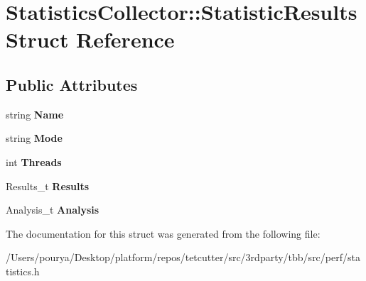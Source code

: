 \hypertarget{structStatisticsCollector_1_1StatisticResults}{}\section{Statistics\+Collector\+:\+:Statistic\+Results Struct Reference}
\label{structStatisticsCollector_1_1StatisticResults}
\subsection*{Public Attributes}
\begin{DoxyCompactItemize}
\item 
\hypertarget{structStatisticsCollector_1_1StatisticResults_a63c538874d95a6f6d91e16ead9a231b8}{}string {\bfseries Name}\label{structStatisticsCollector_1_1StatisticResults_a63c538874d95a6f6d91e16ead9a231b8}

\item 
\hypertarget{structStatisticsCollector_1_1StatisticResults_a173f4ae6f07474c25bef4e4b09756c7e}{}string {\bfseries Mode}\label{structStatisticsCollector_1_1StatisticResults_a173f4ae6f07474c25bef4e4b09756c7e}

\item 
\hypertarget{structStatisticsCollector_1_1StatisticResults_a7e977eed87cfb569f970bae50d7bf21d}{}int {\bfseries Threads}\label{structStatisticsCollector_1_1StatisticResults_a7e977eed87cfb569f970bae50d7bf21d}

\item 
\hypertarget{structStatisticsCollector_1_1StatisticResults_af7502552979e114f559d2c6da441f526}{}Results\+\_\+t {\bfseries Results}\label{structStatisticsCollector_1_1StatisticResults_af7502552979e114f559d2c6da441f526}

\item 
\hypertarget{structStatisticsCollector_1_1StatisticResults_ad8a73c604041624a732edd2c717979e8}{}Analysis\+\_\+t {\bfseries Analysis}\label{structStatisticsCollector_1_1StatisticResults_ad8a73c604041624a732edd2c717979e8}

\end{DoxyCompactItemize}


The documentation for this struct was generated from the following file\+:\begin{DoxyCompactItemize}
\item 
/\+Users/pourya/\+Desktop/platform/repos/tetcutter/src/3rdparty/tbb/src/perf/statistics.\+h\end{DoxyCompactItemize}
